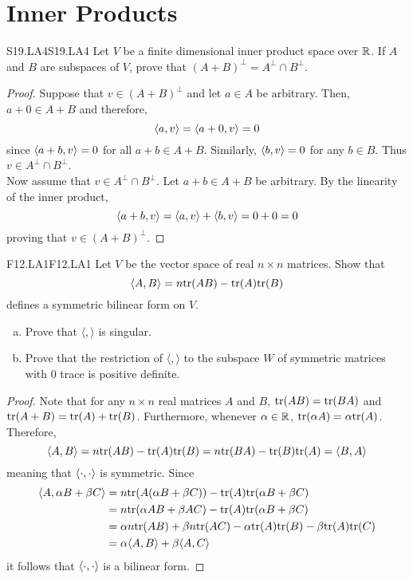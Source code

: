 \documentclass[../AlgebraQualSolutions.tex]{subfiles}
\begin{document}
\section{Inner Products}

\begin{prob}{S19.LA4}{S19.LA4}
    Let $V$ be a finite dimensional inner product space over $\mathbb{R}$. If $A$ and $B$ are subspaces of $V$, prove that $(A+B)^\perp = A^\perp \cap B^\perp$.
\end{prob}

\begin{proof}
    Suppose that $v \in (A+B)^\perp$ and let $a \in A$ be arbitrary. Then, $a + 0 \in A+B$ and therefore,
        \[\langle a, v\rangle = \langle a+0, v\rangle = 0\]
    since $\langle a + b, v\rangle = 0$ for all $a + b \in A + B$. Similarly, $\langle b, v\rangle = 0$ for any $b \in B$. Thus $v \in A^\perp \cap B^\perp$.\\

    Now assume that $v \in A^\perp \cap B^\perp$. Let $a + b \in A + B$ be arbitrary. By the linearity of the inner product,
        \[\langle a + b, v\rangle = \langle a, v\rangle + \langle b, v\rangle = 0 + 0 = 0\]
    proving that $v \in (A+B)^\perp$.
\end{proof}

\begin{prob}{F12.LA1}{F12.LA1}
    Let $V$ be the vector space of real $n \times n$ matrices. Show that 	
        \[\langle A, B \rangle = n \mathrm{tr}(AB) - \mathrm{tr}(A)\mathrm{tr}(B) \]
    defines a symmetric bilinear form on $V$.
    \begin{enumerate}[(a)]
    \item Prove that $\langle,\rangle$ is singular.
    \item Prove that the restriction of $\langle,\rangle$ to the subspace $W$ of symmetric matrices with 0 trace is positive definite.
    \end{enumerate}
    \end{prob}
    
    \begin{proof}
        Note that for any $n \times n$ real matrices $A$ and $B$, $\mathrm{tr}(AB) = \mathrm{tr}(BA)$ and $\mathrm{tr}(A+B) = \mathrm{tr}(A) + \mathrm{tr}(B)$. Furthermore, whenever $\alpha \in \mathbb{R}$, $\mathrm{tr}(\alpha A) = \alpha \mathrm{tr}(A)$. Therefore,
            \[\langle A, B\rangle = n \mathrm{tr}(AB) - \mathrm{tr}(A)\mathrm{tr}(B) = n \mathrm{tr}(BA) - \mathrm{tr}(B)\mathrm{tr}(A) = \langle B, A\rangle\]
        meaning that $\langle \cdot, \cdot\rangle$ is symmetric. Since
            \begin{align*}
                \langle A, \alpha B + \beta C\rangle &= n\mathrm{tr}(A(\alpha B + \beta C)) - \mathrm{tr}(A) \mathrm{tr}(\alpha B + \beta C)\\
                &= n\mathrm{tr}(\alpha AB + \beta AC) - \mathrm{tr}(A) \mathrm{tr}(\alpha B + \beta C)\\
                &= \alpha n \mathrm{tr}(AB) + \beta n \mathrm{tr}(AC) - \alpha \mathrm{tr}(A)\mathrm{tr}(B) - \beta \mathrm{tr}(A)\mathrm{tr}(C)\\
                &= \alpha \langle A, B\rangle + \beta\langle A, C\rangle
            \end{align*}
        it follows that $\langle \cdot, \cdot\rangle$ is a bilinear form.
    \end{proof}
    
\end{document}
